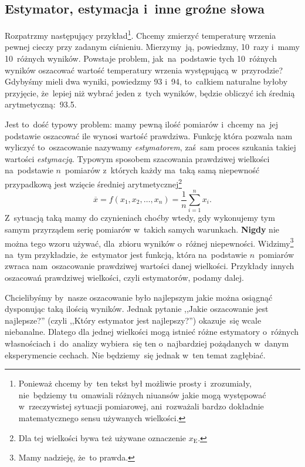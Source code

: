 \documentclass[a4paper,11pt]{article}
\newcommand{\ld}{\ldots}
\begin{document}
\subsection{Estymator, estymacja i~inne groźne słowa}
\label{sec:estymator}

Rozpatrzmy następujący przykład\footnote{Ponieważ chcemy by~ten tekst
  był możliwie prosty i~zrozumiały, nie~będziemy tu~omawiali różnych
  niuansów jakie mogą występować w~rzeczywistej sytuacji pomiarowej,
  ani~rozważali bardzo dokładnie matematycznego sensu używanych
  wielkości.}. Chcemy zmierzyć temperaturę wrzenia pewnej cieczy przy
zadanym ciśnieniu. Mierzymy~ją, powiedzmy, 10~razy i~mamy 10~różnych
wyników. Powstaje problem, jak~na~podstawie tych 10~różnych wyników
oszacować wartość temperatury wrzenia występującą w~przyrodzie?
Gdybyśmy mieli dwa wyniki, powiedzmy 93\textcelsius{}
i~94\textcelsius, to~całkiem naturalne byłoby przyjęcie, że~lepiej niż
wybrać jeden z~tych wyników, będzie obliczyć ich średnią
arytmetyczną:~93.5\textcelsius.

Jest to~dość typowy problem: mamy pewną ilość pomiarów i~chcemy na~jej
podstawie oszacować ile wynosi wartość prawdziwa. Funkcję która
pozwala nam wyliczyć to~oszacowanie nazywamy \emph{estymatorem},
zaś~sam proces szukania takiej wartości \emph{estymacją}. Typowym
sposobem szacowania prawdziwej wielkości na~podstawie $n$~pomiarów
z~których każdy ma~taką samą niepewność przypadkową jest wzięcie
średniej arytmetycznej\footnote{Dla tej wielkości bywa też używane
  oznaczenie $x_{ \textrm{E} }$.}
\begin{equation}
  \label{eq:3}
  \overline{ x } = f( x_{ 1 }, x_{ 2 }, \ld, x_{ n } )
  = \frac{ 1 }{ n } \sum_{ i = 1 }^{ n } x_{ i }.
\end{equation}
Z~sytuacją taką mamy do czynieniach choćby wtedy, gdy wykonujemy tym
samym przyrządem serię pomiarów w~takich samych warunkach.
\textbf{Nigdy} nie można tego wzoru używać, dla~zbioru wyników
o~różnej niepewności. Widzimy\footnote{Mamy nadzieję, że~to prawda.}
na~tym przykładzie, że~estymator jest funkcją, która na~podstawie
$n$~pomiarów zwraca nam~oszacowanie prawdziwej wartości danej
wielkości. Przykłady innych oszacowań prawdziwej wielkości, czyli
estymatorów, podamy dalej.

Chcielibyśmy by~nasze oszacowanie było najlepszym jakie można osiągnąć
dysponując taką ilością wyników. Jednak pytanie ,,Jakie oszacowanie
jest najlepsze?'' (czyli ,,Który estymator jest najlepszy?'')
okazuje~się wcale niebanalne. Dlatego dla jednej wielkości mogą
istnieć różne estymatory o~różnych własnościach i~do~analizy
wybiera~się ten o~najbardziej pożądanych w~danym eksperymencie
cechach. Nie będziemy~się jednak w~ten temat zagłębiać.
\end{document}
